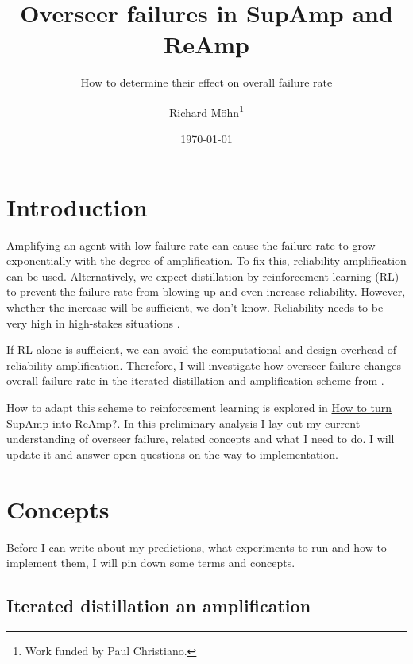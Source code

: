 \documentclass{farlamp}
\title{Overseer failures in SupAmp and ReAmp}
\subtitle{How to determine their effect on overall failure rate}
\author{Richard Möhn\thanks{Work funded by Paul Christiano.}}
\date{\today}
\begin{document}
\maketitle
\tableofcontents

\section{Introduction}

Amplifying an agent with low failure rate can cause the failure rate to grow
exponentially with the degree of amplification. To fix this, reliability
amplification can be used. Alternatively, we expect distillation by
reinforcement learning (RL) to prevent the failure rate from blowing up and even
increase reliability.
However, whether the increase will be sufficient, we don't know.
\parencite{ChriRelAmp} Reliability needs to be very high in high-stakes
situations \parencite[see][]{ChriLearnCata}.

If RL alone is sufficient, we can avoid the computational and design overhead of
reliability amplification. Therefore, I will investigate how overseer failure
changes overall failure rate in the iterated distillation and amplification
scheme from \textcite{CSASupAmp}.

How to adapt this scheme to reinforcement learning is explored in
\href{https://github.com/rmoehn/farlamp/raw/master/supamp-reamp.pdf}{How to turn
SupAmp into ReAmp?}. In this preliminary analysis I lay out my current
understanding of overseer failure, related concepts and what I need to do. I
will update it and answer open questions on the way to implementation.


\section{Concepts}

Before I can write about my predictions, what experiments to run and how to
implement them, I will pin down some terms and concepts.


\subsection{Iterated distillation an amplification}

\end{document}
